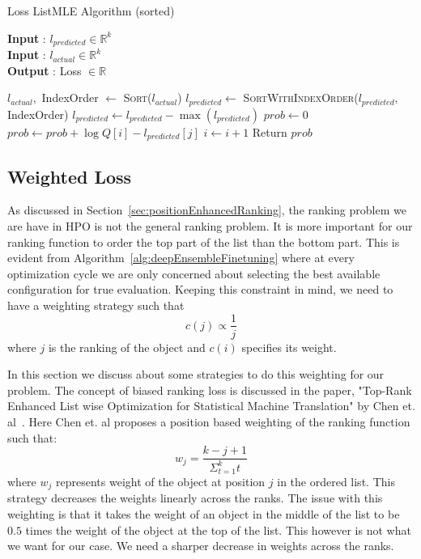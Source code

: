 \documentclass[12pt, twoside, ngerman]{report}
\begin{document}
\begin{algorithm}[h]
\caption{Loss ListMLE Algorithm (sorted)}
\label{alg:listMLESorted}
\hspace*{\algorithmicindent} \textbf{Input} : $l_{predicted} \in \mathbb{R}^k$ \\
\hspace*{\algorithmicindent} \textbf{Input} : $l_{actual} \in \mathbb{R}^k$ \\
\hspace*{\algorithmicindent} \textbf{Output} : Loss $\in \mathbb{R}$
\begin{algorithmic}[1]
\State $l_{actual}, $ IndexOrder $\gets$ \textsc{Sort}($l_{actual}$)
\State $l_{predicted} \gets$ \textsc{SortWithIndexOrder}($l_{predicted}$,  IndexOrder)
\State $l_{predicted} \gets l_{predicted} - \max(l_{predicted})$ 
\State $prob \gets 0$    
        \State $prob \gets prob + \log Q[i] - l_{predicted}[j]$
        \State $i \gets i + 1$
    \EndFor
\State Return $prob$
\EndProcedure
\end{algorithmic}
\end{algorithm}


\subsection{Weighted Loss}
As discussed in Section~\ref{sec:positionEnhancedRanking},  the ranking problem we are have in HPO is not the general ranking problem.
It is more important for our ranking function to order the top part of the list than the bottom part.
This is evident from Algorithm~\ref{alg:deepEnsembleFinetuning} where at every optimization cycle we are only concerned about selecting the best available configuration for true evaluation.
Keeping this constraint in mind,  we need to have a weighting strategy such that
$$
c(j) \propto \frac{1}{j}
$$
where $j$ is the ranking of the object and $c(i)$ specifies its weight.

In this section we discuss about some strategies to do this weighting for our problem.
The concept of biased ranking loss is discussed in the paper, "Top-Rank Enhanced List wise Optimization for Statistical Machine Translation" by  Chen et. al~\cite{TRLWO}.
Here Chen et. al proposes a position based weighting of the ranking function such that:
\begin{equation}
w_j = \frac{k - j + 1}{\Sigma_{t=1}^k t}
\end{equation}
where $w_j$ represents weight of the object at position $j$ in the ordered list.
This strategy decreases the weights linearly across the ranks.
The issue with this weighting is that it takes the weight of an object in the middle of the list to be $0.5$ times the weight of the object at the top of the list.
This however is not what we want for our case.
We need a sharper decrease in weights across the ranks.
\end{document}

